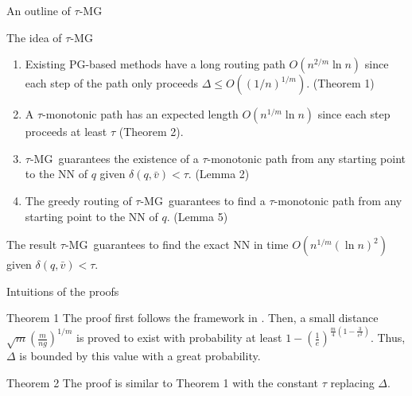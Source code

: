 \documentclass[12pt]{beamer}
\newcommand{\tauMG}{$\tau$-MG\ }
\begin{document}
\begin{frame}{An outline of \tauMG}
    \begin{block}{The idea of \tauMG}
    \begin{enumerate}
      \item Existing PG-based methods have a long routing path $O(n^{2/m} \ln n)$ since each step of the path only proceeds $\Delta \leq O((1/n)^{1/m})$. (Theorem 1)
      \item A $\tau$-monotonic path has an expected length $O(n^{1/m} \ln n)$ since each step proceeds at least $\tau$ (Theorem 2).
      \item \tauMG guarantees the existence of a $\tau$-monotonic path from any starting point to the NN of $q$ given $\delta(q, \bar{v}) < \tau$. (Lemma 2)
      \item The greedy routing of \tauMG guarantees to find a $\tau$-monotonic path from any starting point to the NN of $q$. (Lemma 5)
    \end{enumerate}
  \end{block}
  \begin{block}{The result}
    \tauMG guarantees to find the exact NN in time $O(n^{1/m} (\ln n)^2)$ given $\delta(q, \bar{v}) < \tau$.
  \end{block}
\end{frame}

\begin{frame}{Intuitions of the proofs}
  \begin{block}{Theorem 1}
   The proof first follows the framework in \cite{fu_fast_2018}. Then, a small distance $\sqrt{m}\left(\frac{m}{n g}\right)^{1 / m}$ is proved to exist with probability at least $1-\left(\frac{1}{e}\right)^{\frac{m}{4}\left(1-\frac{3}{e^{2}}\right)}$. Thus, $\Delta$ is bounded by this value with a great probability. 
  \end{block}
  \begin{block}{Theorem 2}
    The proof is similar to Theorem 1 with the constant $\tau$ replacing $\Delta$.
  \end{block}
\end{frame}
\end{document}
